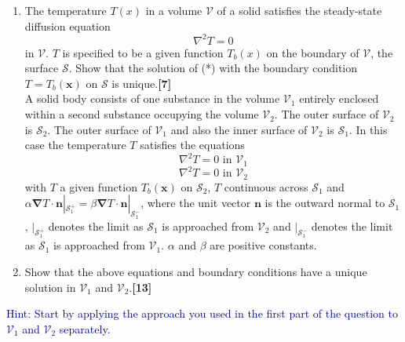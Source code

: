 \documentclass[a4paper]{article}
\begin{document}
\begin{qns}\leavevmode
\begin{enumerate}[label=(\roman*)]
\item The temperature $T(x)$ in a volume $\mathcal{V}$ of a solid satisfies the steady-state diffusion equation
\begin{equation}
    \nabla^2T=0\tag{*}
\end{equation}
in $\mathcal{V}$. $T$ is specified to be a given function $T_b(x)$ on the boundary of $\mathcal{V}$, the surface $\mathcal{S}$. Show that the solution of (*) with the boundary condition $T=T_b(\mathbf{x})$ on $\mathcal{S}$ is unique.\hfill\textbf{[7]}\\[5pt]
A solid body consists of one substance in the volume $\mathcal{V}_1$ entirely enclosed within a second substance occupying the volume $\mathcal{V}_2$. The outer surface of $\mathcal{V}_2$ is $\mathcal{S}_2$. The outer
surface of $\mathcal{V}_1$ and also the inner surface of $\mathcal{V}_2$ is $\mathcal{S}_1$. In this case the temperature $T$ satisfies the equations
$$\nabla^2T=0\text{ in }\mathcal{V}_1$$
$$\nabla^2T=0\text{ in }\mathcal{V}_2$$
with $T$ a given function $T_b(\mathbf{x})$ on $\mathcal{S}_2$, $T$ continuous across $\mathcal{S}_1$ and $\alpha\boldsymbol{\nabla}T\cdot\mathbf{n}|_{\mathcal{S}_1^+}=\beta\boldsymbol{\nabla}T\cdot\mathbf{n}|_{\mathcal{S}_1^-}$, where the unit vector $\mathbf{n}$ is the outward normal to $\mathcal{S}_1$, $|_{\mathcal{S}_1^+}$ denotes the limit as $\mathcal{S}_1$ is approached from $\mathcal{V}_2$ and $|_{\mathcal{S}^−_1}$ denotes the limit as $\mathcal{S}_1$ is approached from $\mathcal{V}_1$. $\alpha$ and $\beta$ are positive constants.
\item Show that the above equations and boundary conditions have a unique solution in $\mathcal{V}_1$ and $\mathcal{V}_2$.\hfill\textbf{[13]}
\end{enumerate}
\begin{mdframed}
\textcolor{darkblue}{Hint: Start by applying the approach you used in the first part of the question to $\mathcal{V}_1$ and $\mathcal{V}_2$ separately.}
\end{mdframed}
\end{qns}
\end{document}
